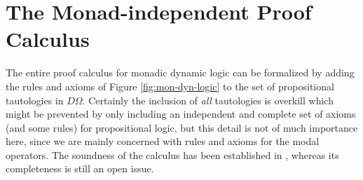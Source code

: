 \section{The Monad-independent Proof Calculus}
\label{sec:monad-indep-calc}

The entire proof calculus for monadic dynamic logic can be formalized by adding
the rules and axioms of Figure \ref{fig:mon-dyn-logic} to the set of
propositional tautologies in $D\Omega$. Certainly the inclusion of \emph{all}
tautologies is overkill which might be prevented by only including an
independent and complete set of axioms (and some rules) for propositional logic,
but this detail is not of much importance here, since we are mainly concerned
with rules and axioms for the modal operators. The soundness of the calculus has
been established in \cite{SchroederMossakowski:PDL}, whereas its completeness is
still an open issue.

